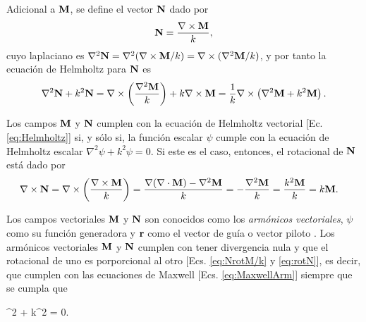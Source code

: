 Adicional a $\vb{M}$, se define el vector $\vb{N}$ dado por 
	\begin{align}
	\vb{N} = \frac{\nabla\times \vb{M}}{k}, \label{eq:NrotM/k}
	\end{align}
cuyo laplaciano es $\nabla^2 \vb{N} = \nabla^2( \nabla\times \vb{M} /k) =  \nabla\times (\nabla^2\vb{M} /k) $, y por tanto la ecuación de Helmholtz para $\vb{N}$ es
	\begin{align*}
	\nabla^2 \vb{N} + k^2 \vb{N} =  \nabla\times \left( \frac{\nabla^2 \vb{M}}{k} \right) + k \nabla\times \vb{M} 
		 = \frac{1}{k} \nabla\times \left( \nabla^2 \vb{M} + k^2  \vb{M} \right).
	\end{align*}
	
Los campos $\vb{M}$ y $\vb{N}$ cumplen con la  ecuación de Helmholtz vectorial [Ec. \eqref{eq:Helmholtz}] si, y sólo si, la función escalar $\psi$ cumple con la ecuación de Helmholtz escalar $\nabla^2 \psi + k^2 \psi = 0$. Si este es el caso, entonces, el rotacional de $\vb{N}$ está dado por
	\begin{align}
	\nabla\times \vb{N} &= \nabla\times \qty(\frac{\nabla\times \vb{M}}{k})  
						= \frac{\nabla\qty(\nabla\cdot\vb{M})-\nabla^2\vb{M}}{k}
						= - \frac{\nabla^2 \vb{M}}{k}
						= \frac{k^2 \vb{M}}{k}
						= k \vb{M}.\label{eq:rotN}
	\end{align}
	
Los campos vectoriales $\vb{M}$ y $\vb{N}$ son conocidos como los \emph{armónicos  vectoriales}, $\psi$ como su función generadora y $\vb{r}$ como el vector de guía o vector piloto \cite{bohren1998absorption}. Los armónicos vectoriales $\vb{M}$ y $\vb{N}$  cumplen con tener divergencia nula y que el rotacional de uno es porporcional al otro [Ecs. \eqref{eq:NrotM/k} y \eqref{eq:rotN}], es decir, que cumplen con las ecuaciones de Maxwell [Ecs. \eqref{eq:MaxwellArm}] siempre que se cumpla que\vspace*{-.5em}
	\begin{tcolorbox}[title = $\mathbf{\psi}$: Función generadora de los armónicos  vectoriales, ams align ]
	\nabla^2 \psi + k^2 \psi  = 0.\label{eq:AV_psi}
	\end{tcolorbox}

